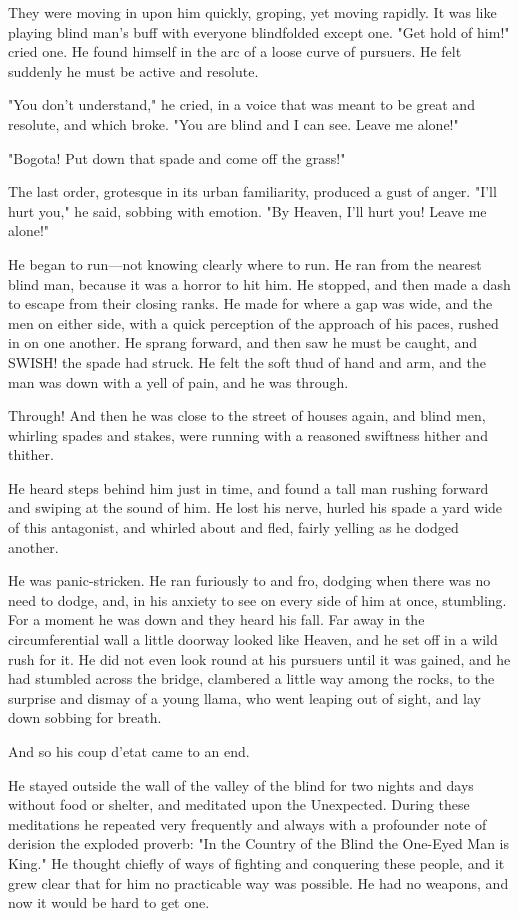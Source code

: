 \documentclass[submission]{sffms}
\begin{document}
They were moving in upon him quickly, groping, yet moving rapidly. It
was like playing blind man's buff with everyone blindfolded except
one. "Get hold of him!" cried one. He found himself in the arc of a
loose curve of pursuers. He felt suddenly he must be active and
resolute.

"You don't understand," he cried, in a voice that was meant to be
great and resolute, and which broke. "You are blind and I can
see. Leave me alone!"

"Bogota! Put down that spade and come off the grass!"

The last order, grotesque in its urban familiarity, produced a gust of
anger.  "I'll hurt you," he said, sobbing with emotion. "By Heaven,
I'll hurt you! Leave me alone!"

He began to run---not knowing clearly where to run. He ran from the
nearest blind man, because it was a horror to hit him. He stopped, and
then made a dash to escape from their closing ranks. He made for where
a gap was wide, and the men on either side, with a quick perception of
the approach of his paces, rushed in on one another. He sprang
forward, and then saw he must be caught, and SWISH!  the spade had
struck. He felt the soft thud of hand and arm, and the man was down
with a yell of pain, and he was through.

Through! And then he was close to the street of houses again, and
blind men, whirling spades and stakes, were running with a reasoned
swiftness hither and thither.

He heard steps behind him just in time, and found a tall man rushing
forward and swiping at the sound of him. He lost his nerve, hurled his
spade a yard wide of this antagonist, and whirled about and fled,
fairly yelling as he dodged another.

He was panic-stricken. He ran furiously to and fro, dodging when there
was no need to dodge, and, in his anxiety to see on every side of him
at once, stumbling. For a moment he was down and they heard his
fall. Far away in the circumferential wall a little doorway looked
like Heaven, and he set off in a wild rush for it. He did not even
look round at his pursuers until it was gained, and he had stumbled
across the bridge, clambered a little way among the rocks, to the
surprise and dismay of a young llama, who went leaping out of sight,
and lay down sobbing for breath.

And so his coup d'etat came to an end.

He stayed outside the wall of the valley of the blind for two nights
and days without food or shelter, and meditated upon the
Unexpected. During these meditations he repeated very frequently and
always with a profounder note of derision the exploded proverb: "In
the Country of the Blind the One-Eyed Man is King." He thought chiefly
of ways of fighting and conquering these people, and it grew clear
that for him no practicable way was possible. He had no weapons, and
now it would be hard to get one.
\end{document}

